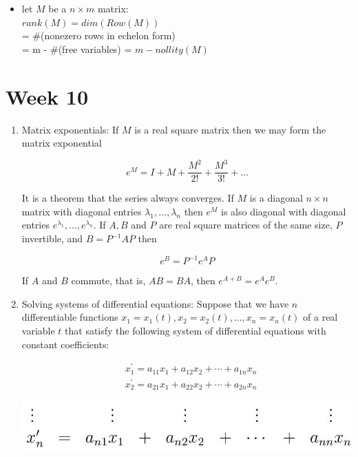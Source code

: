 \documentclass{article}
\begin{document}
\begin{enumerate}
\begin{itemize}
                \item let $M$ be a $n \times m$ matrix:\\
                $rank(M) = dim(Row(M))$\\
                = \#(nonezero rows in echelon form)\\
                = m - \#(free variables) = $m - nollity(M)$
            \end{itemize}
    \end{enumerate}

\section{Week 10}
    \begin{enumerate}
        \item Matrix exponentials: If $M$ is a real square matrix then we may form the matrix exponential

        $$
        e^{M}=I+M+\frac{M^{2}}{2!}+\frac{M^{3}}{3!}+\ldots
        $$

        It is a theorem that the series always converges. If $M$ is a diagonal $n \times n$ matrix with diagonal entries $\lambda_{1}, \ldots, \lambda_{n}$ then $e^{M}$ is also diagonal with diagonal entries $e^{\lambda_{1}}, \ldots, e^{\lambda_{n}}$. If $A, B$ and $P$ are real square matrices of the same size, $P$ invertible, and $B=P^{-1} A P$ then

        $$
        e^{B}=P^{-1} e^{A} P
        $$

        If $A$ and $B$ commute, that is, $A B=B A$, then $e^{A+B}=e^{A} e^{B}$.

        \item Solving systems of differential equations: Suppose that we have $n$ differentiable functions $x_{1}=x_{1}(t), x_{2}=x_{2}(t), \ldots, x_{n}=x_{n}(t)$ of a real variable $t$ that satisfy the following system of differential equations with constant coefficients:

        $$
        \begin{aligned}
        & x_{1}^{\prime}=a_{11} x_{1}+a_{12} x_{2}+\cdots+a_{1 n} x_{n} \\
        & x_{2}^{\prime}=a_{21} x_{1}+a_{22} x_{2}+\cdots+a_{2 n} x_{n}
        \end{aligned}
        $$

        \begin{center}
        \includegraphics[width=1.0\textwidth]{Graphs/2024_05_26_7d8792d442ce21068082g-1.jpg}
        \end{center}


\end{enumerate}
\end{document}
